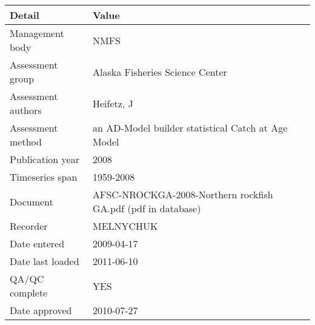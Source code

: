\begin{table}[htb]
\centering
\begin{tabular}{lp{7cm}}
\toprule
Detail & Value \\
\midrule
Management body    & NMFS                                                         \\
Assessment group   & Alaska Fisheries Science Center                              \\
Assessment authors & Heifetz, J                                                   \\
Assessment method  & an AD-Model builder statistical Catch at Age Model           \\
Publication year   & 2008                                                         \\
Timeseries span    & 1959-2008                                                    \\
Document           & AFSC-NROCKGA-2008-Northern rockfish GA.pdf (pdf in database) \\
Recorder           & MELNYCHUK                                                    \\
Date entered       & 2009-04-17                                                   \\
Date last loaded   & 2011-06-10                                                   \\
QA/QC complete     & YES                                                          \\
Date approved      & 2010-07-27                                                   \\
\bottomrule
\end{tabular}
\label{tab:assessdet}
\end{table}
